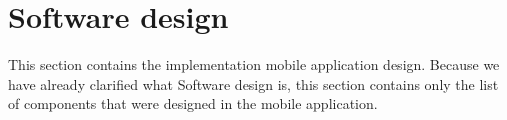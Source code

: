 \section{Software design}\label{sec:software-design}
This section contains the implementation mobile application design.
Because we have already clarified what Software design is, this section contains only the list of components that were designed in the mobile application.







